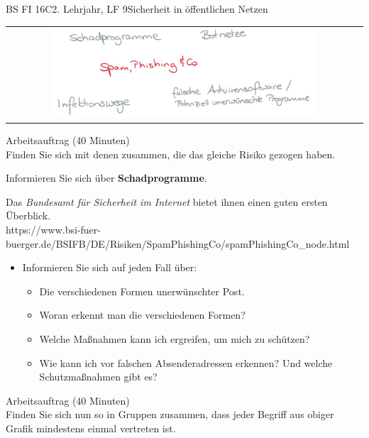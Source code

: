 \documentclass[oneside,openany,headings=optiontotoc,11pt,numbers=noenddot]{scrreprt}
\begin{document}
\begin{worksheet}{BS FI 16C}{2. Lehrjahr, LF 9}{Sicherheit in öffentlichen Netzen}
		\newpage
		\setcounter{page}{1}
		\begin{framed}
			\begin{tabular}{lcr}
				& \includegraphics[width=0.8\textwidth]{Bilder/SpamPhishing.jpg} & \\
			\end{tabular}
		\end{framed}
		\color{codegray}Arbeitsauftrag (40 Minuten)\\
		\color{black}
		Finden Sie sich mit denen zusammen, die das gleiche Risiko gezogen haben.
		\par
		\bigskip
		\noindent
		Informieren Sie sich über \textbf{Schadprogramme}.
		\par\bigskip\noindent
		Das \textit{Bundesamt für Sicherheit im Internet} bietet ihnen einen guten ersten Überblick.\\
		\small{\color{codegray}https://www.bsi-fuer-buerger.de/BSIFB/DE/Risiken/SpamPhishingCo/spamPhishingCo\_node.html}
		\normalsize
		\begin{itemize}
			\item[] Informieren Sie sich auf jeden Fall über:
			\begin{itemize}
				\item[] Die verschiedenen Formen unerwünschter Post.
				\item[] Woran erkennt man die verschiedenen Formen?
				\item[] Welche Maßnahmen kann ich ergreifen, um mich zu schützen?
				\item[] Wie kann ich vor falschen Absenderadressen erkennen? Und welche Schutzmaßnahmen gibt es?
			\end{itemize}
		\end{itemize}
		\par
		\bigskip
		\noindent
		
		\color{codegray}Arbeitsauftrag (40 Minuten)\\
		\color{black}
		Finden Sie sich nun so in Gruppen zusammen, dass jeder Begriff aus obiger Grafik mindestens einmal vertreten ist.


\end{worksheet}
\end{document}
